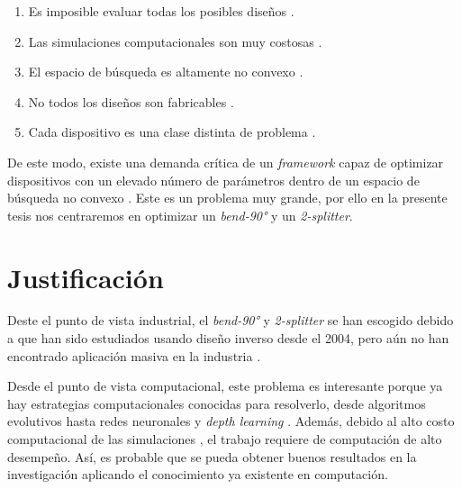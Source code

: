 \begin{enumerate}
  \item Es imposible evaluar todas los posibles diseños .
  \item Las simulaciones computacionales son muy costosas  \citep{Kudyshev2020}.
  \item El espacio de búsqueda es altamente no convexo \citep{Su2018}.
  \item No todos los diseños son fabricables \citep{Su2020} .
  \item Cada dispositivo es una clase distinta de problema  \citep{Molesky2018}.
\end{enumerate}

De este modo, existe una demanda crítica de un \emph{framework} capaz de optimizar dispositivos con un elevado número de parámetros dentro de un espacio de búsqueda no convexo \citep{Kudyshev2020}. Este es un problema muy grande, por ello en la presente tesis nos centraremos en optimizar un \emph{bend-90°} y un \emph{2-splitter}. 

\section{Justificación}

Deste el punto de vista industrial, el \emph{bend-90°} y \emph{2-splitter} se han escogido debido a que han sido estudiados usando diseño inverso desde el 2004, pero aún no han encontrado aplicación masiva en la industria \citep{Molesky2018}. 

Desde el punto de vista computacional, este problema es interesante porque ya hay estrategias computacionales conocidas para resolverlo, desde algoritmos evolutivos \citep{Hansen2016} hasta redes neuronales \citep{Goodfellow2015} y \emph{depth learning} \citep{Malkiel2018}. 
Además, debido al alto costo computacional de las simulaciones \citep{Schneider2019}, el trabajo requiere de computación de alto desempeño.
Así, es probable que se pueda obtener buenos resultados en la investigación aplicando el conocimiento ya existente en computación. 

